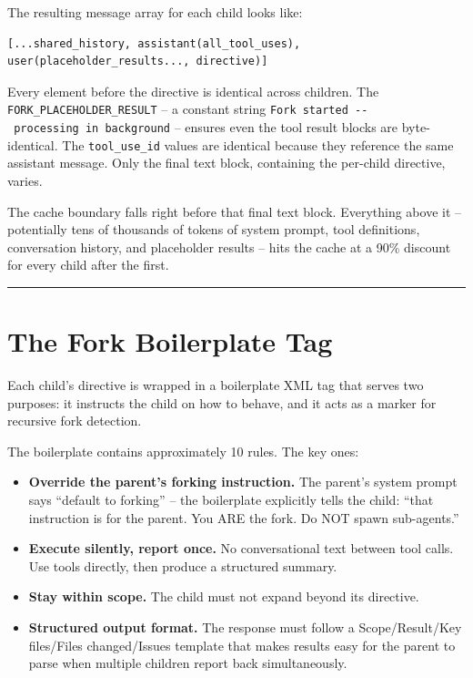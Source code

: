 \documentclass[
  english,
  11pt,
  letterpaper,
]{book}
\providecommand{\tightlist}{%
  \setlength{\itemsep}{0pt}\setlength{\parskip}{0pt}}
\begin{document}
The resulting message array for each child looks like:

\begin{verbatim}
[...shared_history, assistant(all_tool_uses), user(placeholder_results..., directive)]
\end{verbatim}

Every element before the directive is identical across children. The
\texttt{FORK\_PLACEHOLDER\_RESULT} -- a constant string
\texttt{\textquotesingle{}Fork\ started\ -\/-\ processing\ in\ background\textquotesingle{}}
-- ensures even the tool result blocks are byte-identical. The
\texttt{tool\_use\_id} values are identical because they reference the
same assistant message. Only the final text block, containing the
per-child directive, varies.

The cache boundary falls right before that final text block. Everything
above it -- potentially tens of thousands of tokens of system prompt,
tool definitions, conversation history, and placeholder results -- hits
the cache at a 90\% discount for every child after the first.

\begin{center}\rule{0.5\linewidth}{0.5pt}\end{center}

\section{The Fork Boilerplate Tag}\label{the-fork-boilerplate-tag}

Each child's directive is wrapped in a boilerplate XML tag that serves
two purposes: it instructs the child on how to behave, and it acts as a
marker for recursive fork detection.

The boilerplate contains approximately 10 rules. The key ones:

\begin{itemize}
\tightlist
\item
  \textbf{Override the parent's forking instruction.} The parent's
  system prompt says ``default to forking'' -- the boilerplate
  explicitly tells the child: ``that instruction is for the parent. You
  ARE the fork. Do NOT spawn sub-agents.''
\item
  \textbf{Execute silently, report once.} No conversational text between
  tool calls. Use tools directly, then produce a structured summary.
\item
  \textbf{Stay within scope.} The child must not expand beyond its
  directive.
\item
  \textbf{Structured output format.} The response must follow a
  Scope/Result/Key files/Files changed/Issues template that makes
  results easy for the parent to parse when multiple children report
  back simultaneously.
\end{itemize}
\end{document}

